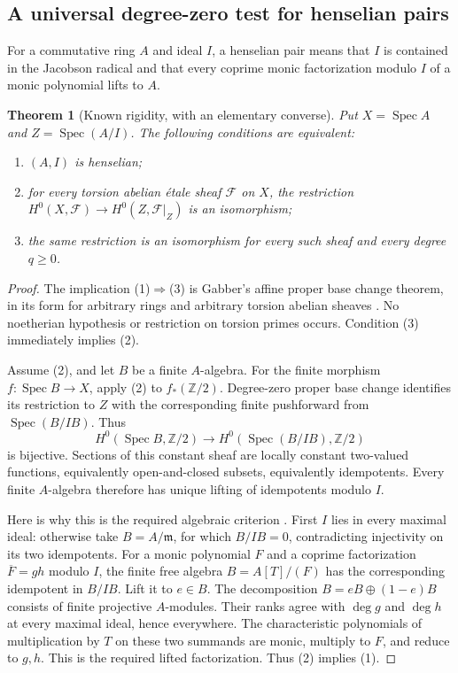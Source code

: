 \documentclass[11pt,a4paper]{article}
\newtheorem{theorem}{Theorem}[section]
\theoremstyle{definition}
\newcommand{\Spec}{\operatorname{Spec}}
\newcommand{\Z}{\mathbb Z}
\begin{document}
\subsection{A universal degree-zero test for henselian pairs}
For a commutative ring $A$ and ideal $I$, a henselian pair means that $I$ is contained in the Jacobson radical and that every coprime monic factorization modulo $I$ of a monic polynomial lifts to $A$.
\begin{theorem}[Known rigidity, with an elementary converse]\label{thm:henselian}
Put $X=\Spec A$ and $Z=\Spec(A/I)$. The following conditions are equivalent:
\begin{enumerate}
\item $(A,I)$ is henselian;
\item for every torsion abelian étale sheaf $\mathcal F$ on $X$, the restriction $H^0(X,\mathcal F)\to H^0(Z,\mathcal F|_Z)$ is an isomorphism;
\item the same restriction is an isomorphism for every such sheaf and every degree $q\ge0$.
\end{enumerate}
\end{theorem}
\begin{proof}
The implication (1)$\Rightarrow$(3) is Gabber's affine proper base change theorem, in its form for arbitrary rings and arbitrary torsion abelian sheaves \cite[Theorem~59.82.7, tag 09ZI]{Stacks}. No noetherian hypothesis or restriction on torsion primes occurs. Condition (3) immediately implies (2).

Assume (2), and let $B$ be a finite $A$-algebra. For the finite morphism $f:\Spec B\to X$, apply (2) to $f_*(\Z/2)$. Degree-zero proper base change identifies its restriction to $Z$ with the corresponding finite pushforward from $\Spec(B/IB)$. Thus
\[
 H^0(\Spec B,\Z/2)\longrightarrow
 H^0(\Spec(B/IB),\Z/2)
\]
is bijective. Sections of this constant sheaf are locally constant two-valued functions, equivalently open-and-closed subsets, equivalently idempotents. Every finite $A$-algebra therefore has unique lifting of idempotents modulo $I$.

Here is why this is the required algebraic criterion \cite[Lemma~15.11.6, tag 09XI]{Stacks}. First $I$ lies in every maximal ideal: otherwise take $B=A/\mathfrak m$, for which $B/IB=0$, contradicting injectivity on its two idempotents. For a monic polynomial $F$ and a coprime factorization $\overline F=gh$ modulo $I$, the finite free algebra $B=A[T]/(F)$ has the corresponding idempotent in $B/IB$. Lift it to $e\in B$. The decomposition $B=eB\oplus(1-e)B$ consists of finite projective $A$-modules. Their ranks agree with $\deg g$ and $\deg h$ at every maximal ideal, hence everywhere. The characteristic polynomials of multiplication by $T$ on these two summands are monic, multiply to $F$, and reduce to $g,h$. This is the required lifted factorization. Thus (2) implies (1).
\end{proof}
\end{document}
